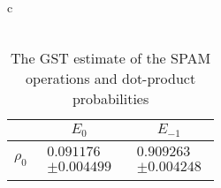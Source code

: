 \documentclass{beamer}
\begin{document}
\begin{frame}
\begin{table}[h]
\begin{center}
{\begin{tabular}{c}
\\
\vspace{2em}
\\
\begin{tabular}[l]{|c|c|c|}
\hline
 & $E_{0}$ & $E_{-1}$ \\ \hline
$\rho_{0}$ & $ \begin{array}{c} 0.091176 \\ \pm 0.004499 \end{array} $ & $ \begin{array}{c} 0.909263 \\ \pm 0.004248 \end{array} $ \\ \hline
\end{tabular}

\end{tabular}
}
\caption{The GST estimate of the SPAM operations and dot-product probabilities}
\end{center}
\end{table}

\end{frame}
\end{document}
